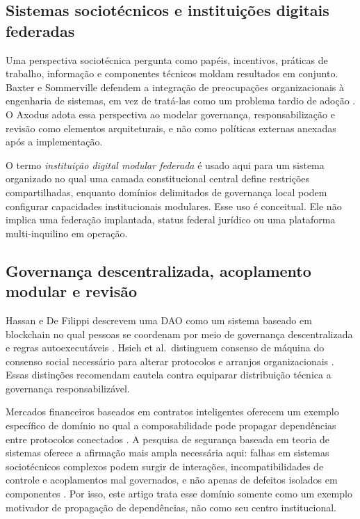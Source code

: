 \documentclass[11pt]{article}
\begin{document}
\subsection{Sistemas sociotécnicos e instituições digitais federadas}

Uma perspectiva sociotécnica pergunta como papéis, incentivos, práticas de
trabalho, informação e componentes técnicos moldam resultados em conjunto.
Baxter e Sommerville defendem a integração de preocupações organizacionais à
engenharia de sistemas, em vez de tratá-las como um problema tardio de adoção
\citep{baxter2011sociotechnical}. O Axodus adota essa perspectiva ao modelar
governança, responsabilização e revisão como elementos arquiteturais, e não
como políticas externas anexadas após a implementação.

O termo \emph{instituição digital modular federada} é usado aqui para um
sistema organizado no qual uma camada constitucional central define
restrições compartilhadas, enquanto domínios delimitados de governança local
podem configurar capacidades institucionais modulares. Esse uso é conceitual.
Ele não implica uma federação implantada, status federal jurídico ou uma
plataforma multi-inquilino em operação.

\subsection{Governança descentralizada, acoplamento modular e revisão}

Hassan e De Filippi descrevem uma DAO como um sistema baseado em blockchain no
qual pessoas se coordenam por meio de governança descentralizada e regras
autoexecutáveis \citep{hassan2021dao}. Hsieh et al.\ distinguem consenso de
máquina do consenso social necessário para alterar protocolos e arranjos
organizacionais \citep{hsieh2018bitcoin}. Essas distinções recomendam cautela
contra equiparar distribuição técnica a governança responsabilizável.

Mercados financeiros baseados em contratos inteligentes oferecem um exemplo
específico de domínio no qual a composabilidade pode propagar dependências
entre protocolos conectados \citep{schar2021defi}. A pesquisa de segurança
baseada em teoria de sistemas oferece a afirmação mais ampla necessária aqui:
falhas em sistemas sociotécnicos complexos podem surgir de interações,
incompatibilidades de controle e acoplamentos mal governados, e não apenas de
defeitos isolados em componentes \citep{leveson2012engineering}. Por isso, este
artigo trata esse domínio somente como um exemplo motivador de propagação de
dependências, não como seu centro institucional.
\end{document}
